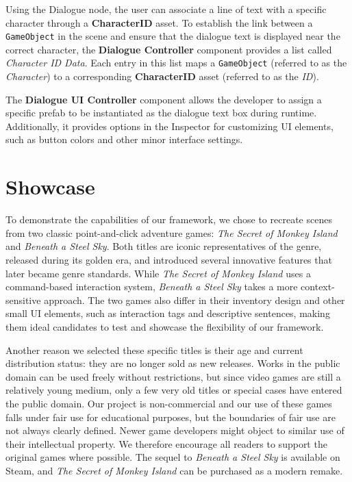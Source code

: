 Using the Dialogue node, the user can associate a line of text with a specific character through a \textbf{CharacterID} asset. To establish the link between a \verb|GameObject| in the scene and ensure that the dialogue text is displayed near the correct character, the \textbf{Dialogue Controller} component provides a list called \textit{Character ID Data}. Each entry in this list maps a \verb|GameObject| (referred to as the \textit{Character}) to a corresponding \textbf{CharacterID} asset (referred to as the \textit{ID}).

The \textbf{Dialogue UI Controller} component allows the developer to assign a specific prefab to be instantiated as the dialogue text box during runtime. Additionally, it provides options in the Inspector for customizing UI elements, such as button colors and other minor interface settings.

\section{Showcase}
To demonstrate the capabilities of our framework, we chose to recreate scenes from two classic point-and-click adventure games: \textit{The Secret of Monkey Island} and \textit{Beneath a Steel Sky}. Both titles are iconic representatives of the genre, released during its golden era, and introduced several innovative features that later became genre standards. While \textit{The Secret of Monkey Island} uses a command-based interaction system, \textit{Beneath a Steel Sky} takes a more context-sensitive approach. The two games also differ in their inventory design and other small UI elements, such as interaction tags and descriptive sentences, making them ideal candidates to test and showcase the flexibility of our framework.

Another reason we selected these specific titles is their age and current distribution status: they are no longer sold as new releases. Works in the public domain can be used freely without restrictions, but since video games are still a relatively young medium, only a few very old titles or special cases have entered the public domain.
Our project is non-commercial and our use of these games falls under fair use for educational purposes, but the boundaries of fair use are not always clearly defined. 
Newer game developers might object to similar use of their intellectual property. We therefore encourage all readers to support the original games where possible. The sequel to \textit{Beneath a Steel Sky} is available on Steam, and \textit{The Secret of Monkey Island} can be purchased as a modern remake.

